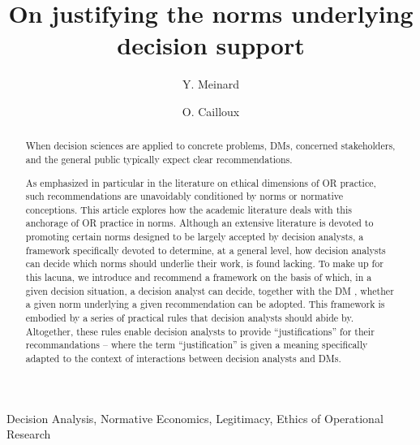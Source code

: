 \documentclass[preprint, french, english, 11pt, authoryear]{elsarticle}%
\begin{document}
\hypersetup{citecolor=black}
\title{On justifying the norms underlying decision support}

\author[ld]{Y. Meinard}
\author[ld]{O. Cailloux}
\address[ld]{Universit\'e Paris-Dauphine, PSL Research University, CNRS, UMR [7243], LAMSADE, 75016 PARIS, FRANCE}

\begin{abstract}
When decision sciences are applied to concrete problems, \acp{DM}, concerned stakeholders, and the general public typically expect clear recommendations.
\begin{changebar}As emphasized in particular in the literature on ethical dimensions of \ac{OR} practice, such recommendations are unavoidably conditioned by norms or normative conceptions.
This article explores how the academic literature deals with this anchorage of \ac{OR} practice in norms. 
Although an extensive literature is devoted to promoting certain norms designed to be largely accepted by decision analysts, a framework specifically devoted to determine, at a general level, how decision analysts can decide which norms should underlie their work, is found lacking.
To make up for this lacuna, we introduce and recommend a framework on the basis of which, in a given decision situation, a decision analyst can decide, together with the \ac{DM}
, whether a given norm underlying a given recommendation can be adopted.
This framework is embodied by a series of practical rules that decision analysts should abide by.
Altogether, these rules enable decision analysts to provide ``justifications'' for their recommandations -- where the term ``justification'' is given a meaning specifically adapted to the context of interactions between decision analysts and \acp{DM}.\end{changebar}

\end{abstract}
\begin{keyword}
Decision Analysis, Normative Economics, Legitimacy, Ethics of Operational Research
\end{keyword}

\maketitle
\end{document}
